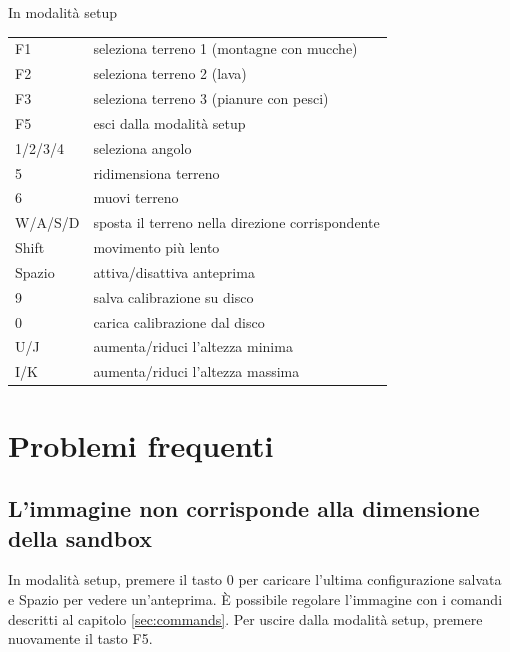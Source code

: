 \documentclass[12pt]{article}
\begin{document}
In modalità setup

\begin{tabular}{l l}
	F1      & seleziona terreno 1 (montagne con mucche)        \\
	F2      & seleziona terreno 2 (lava)                       \\
	F3      & seleziona terreno 3 (pianure con pesci)          \\

	F5      & esci dalla modalità setup                        \\

	1/2/3/4 & seleziona angolo                                 \\
	5       & ridimensiona terreno                             \\
	6       & muovi terreno                                    \\

	W/A/S/D & sposta il terreno nella direzione corrispondente \\
	Shift   & movimento più lento                              \\

	Spazio  & attiva/disattiva anteprima                       \\

	9       & salva calibrazione su disco                      \\
	0       & carica calibrazione dal disco                    \\

	U/J     & aumenta/riduci l'altezza minima                  \\
	I/K     & aumenta/riduci l'altezza massima                 \\
\end{tabular}

\section{Problemi frequenti}

\subsection{L'immagine non corrisponde alla dimensione della sandbox}

In modalità setup, premere il tasto 0 per caricare l'ultima configurazione salvata e
Spazio per vedere un'anteprima. È possibile regolare l'immagine con i comandi descritti
al capitolo \ref{sec:commands}. Per uscire dalla modalità setup, premere nuovamente il tasto F5.\\
\end{document}
